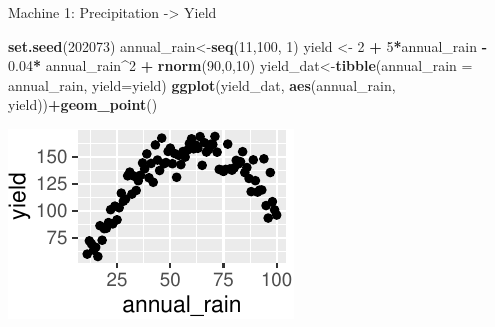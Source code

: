 \documentclass[
  12pt,
  ignorenonframetext,
  aspectratio=169,
]{beamer}
\newenvironment{Shaded}{\begin{snugshade}}{\end{snugshade}}
\newcommand{\DataTypeTok}[1]{\textcolor[rgb]{0.13,0.29,0.53}{#1}}
\newcommand{\DecValTok}[1]{\textcolor[rgb]{0.00,0.00,0.81}{#1}}
\newcommand{\FloatTok}[1]{\textcolor[rgb]{0.00,0.00,0.81}{#1}}
\newcommand{\KeywordTok}[1]{\textcolor[rgb]{0.13,0.29,0.53}{\textbf{#1}}}
\newcommand{\NormalTok}[1]{#1}
\newcommand{\OperatorTok}[1]{\textcolor[rgb]{0.81,0.36,0.00}{\textbf{#1}}}
\newcommand{\StringTok}[1]{\textcolor[rgb]{0.31,0.60,0.02}{#1}}
\begin{document}
\begin{frame}[fragile]{Machine 1: Precipitation -\textgreater{} Yield}
\protect\hypertarget{machine-1-precipitation---yield}{}

\begin{Shaded}
\begin{Highlighting}[]
\KeywordTok{set.seed}\NormalTok{(}\DecValTok{202073}\NormalTok{)}
\NormalTok{annual_rain<-}\KeywordTok{seq}\NormalTok{(}\DecValTok{11}\NormalTok{,}\DecValTok{100}\NormalTok{, }\DecValTok{1}\NormalTok{)}
\NormalTok{yield <-}\StringTok{ }\DecValTok{2} \OperatorTok{+}\StringTok{ }\DecValTok{5}\OperatorTok{*}\NormalTok{annual_rain }\OperatorTok{-}\StringTok{ }\FloatTok{0.04}\OperatorTok{*}\StringTok{ }\NormalTok{annual_rain}\OperatorTok{^}\DecValTok{2} \OperatorTok{+}\StringTok{ }\KeywordTok{rnorm}\NormalTok{(}\DecValTok{90}\NormalTok{,}\DecValTok{0}\NormalTok{,}\DecValTok{10}\NormalTok{)}
\NormalTok{yield_dat<-}\KeywordTok{tibble}\NormalTok{(}\DataTypeTok{annual_rain =}\NormalTok{ annual_rain, }\DataTypeTok{yield=}\NormalTok{yield)}
\KeywordTok{ggplot}\NormalTok{(yield_dat, }\KeywordTok{aes}\NormalTok{(annual_rain, yield))}\OperatorTok{+}\KeywordTok{geom_point}\NormalTok{()}
\end{Highlighting}
\end{Shaded}

\begin{center}\includegraphics{Lecture-2_files/figure-beamer/unnamed-chunk-5-1} \end{center}

\end{frame}
\end{document}
